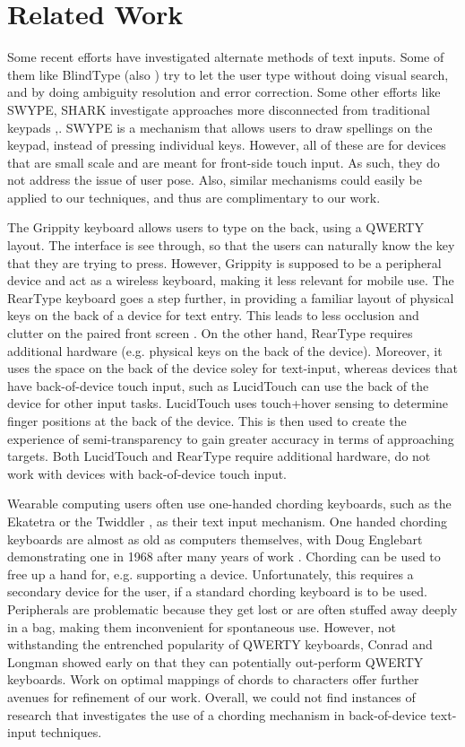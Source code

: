 \section{Related Work}

Some recent efforts have investigated alternate methods of text
inputs. Some of them like BlindType \cite{BlindType} (also
\cite{Brewster}) try to let the user type without doing visual search,
and by doing ambiguity resolution and error correction. Some other
efforts like SWYPE, SHARK investigate approaches more disconnected
from traditional keypads \cite{Zhai},\cite{Swype}. SWYPE is a
mechanism that allows users to draw spellings on the keypad, instead
of pressing individual keys. However, all of these are for devices
that are small scale and are meant for front-side touch input.  As
such, they do not address the issue of user pose.  Also, similar
mechanisms could easily be applied to our techniques, and thus are
complimentary to our work.

The Grippity keyboard \cite{Grippity} allows users to type on the
back, using a QWERTY layout. The interface is see through, so that the
users can naturally know the key that they are trying to
press. However, Grippity is supposed to be a peripheral device and act
as a wireless keyboard, making it less relevant for mobile use. The
RearType keyboard goes a step further, in providing a familiar layout
of physical keys on the back of a device for text entry. This leads to
less occlusion and clutter on the paired front screen
\cite{RearType}. On the other hand, RearType requires additional
hardware (e.g. physical keys on the back of the device). Moreover, it
uses the space on the back of the device soley for text-input, whereas
devices that have back-of-device touch input, such as LucidTouch
\cite{LucidTouch} can use the back of the device for other input
tasks. LucidTouch uses touch+hover sensing to determine finger
positions at the back of the device. This is then used to create the
experience of semi-transparency to gain greater accuracy in terms of
approaching targets. Both LucidTouch and RearType require additional
hardware, do not work with devices with back-of-device
touch input. 

Wearable computing users often use one-handed chording keyboards, such
as the Ekatetra \cite{Ekatetra} or the Twiddler \cite{Twiddler}, as
their text input mechanism.  One handed chording keyboards are almost
as old as computers themselves, with Doug Englebart demonstrating one
in 1968 after many years of work \cite{Englebart}. Chording can be
used to free up a hand for, e.g. supporting a device.  Unfortunately,
this requires a secondary device for the user, if a standard chording
keyboard is to be used.  Peripherals are problematic because they get
lost or are often stuffed away deeply in a bag, making them
inconvenient for spontaneous use.  However, not withstanding the
entrenched popularity of QWERTY keyboards, Conrad and Longman showed
early on that they can potentially out-perform QWERTY
keyboards\cite{Conrad}. Work on optimal mappings of chords to
characters \cite{Gopher} offer further avenues for refinement of our
work. Overall, we could not find instances of research that
investigates the use of a chording mechanism in back-of-device
text-input techniques.

